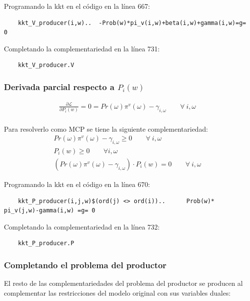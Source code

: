 Programando la kkt en el código en la línea 667:
\begin{verbatim}
    kkt_V_producer(i,w)..  -Prob(w)*pi_v(i,w)+beta(i,w)+gamma(i,w)=g= 0
\end{verbatim}

Completando la complementariedad en la línea 731:
\begin{verbatim}
    kkt_V_producer.V
\end{verbatim}

\subsubsection{Derivada parcial respecto a $P_i(w)$}
\footnotesize{
\begin{align}
   \frac{\partial \mathcal{L} }{\partial P_i(w)}= 0
   = Pr(\omega) \pi^v(\omega) -\gamma_{i,\omega} \qquad \forall \  i, \omega \\
\end{align}
}

Para resolverlo como MCP se tiene la siguiente complementariedad:
\footnotesize{
\begin{align}
    Pr(\omega) \pi^v(\omega) -\gamma_{i,\omega} \geq 0 \qquad \forall \  i, \omega \\
    P_i(w) \geq 0 \qquad \forall  i,\omega \\
    (Pr(\omega) \pi^v(\omega) -\gamma_{i,\omega}) \cdot  P_i(w) = 0  \qquad \forall \  i, \omega 
\end{align}
}

Programando la kkt en el código en la línea 670:
\begin{verbatim}
    kkt_P_producer(i,j,w)$(ord(j) <> ord(i))..      Prob(w)* pi_v(j,w)-gamma(i,w) =g= 0
\end{verbatim}

Completando la complementariedad en la línea 732:
\begin{verbatim}
    kkt_P_producer.P  
\end{verbatim}

\subsubsection{Completando el problema del productor}
El resto de las complementariedades del problema del productor se producen al complementar las restricciones del modelo original con sus variables duales:

